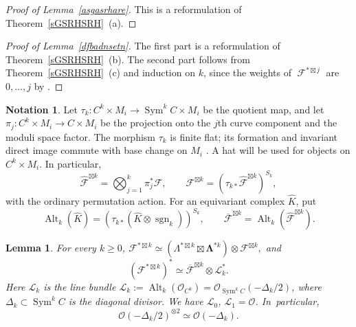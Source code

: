 \documentclass[11pt,letterpaper]{amsart}
\theoremstyle{plain}
\newtheorem{lemma}[theorem]{Lemma}
\theoremstyle{definition}
\newtheorem{notation}[theorem]{Notation}
\theoremstyle{remark}
\numberwithin{equation}{section}
\DeclareMathOperator{\Sym}{Sym}
\DeclareMathOperator{\cF}{\mathcal{F}}
\begin{document}
\begin{proof}[Proof of Lemma~\ref{asgasrhare}]
This is a reformulation of Theorem~\ref{sGSRHSRH}~(a).
\end{proof}



\begin{proof}[Proof of Lemma~\ref{dfbadnsetn}]
The first part is a reformulation of Theorem~\ref{sGSRHSRH}~(b).
The second part follows from Theorem~\ref{sGSRHSRH}~(c) and induction on $k$,
since the weights of $\cF^{*\boxtimes j}$ are $0,\ldots,j$ by \cite[Theorem~3.21]{TT}.
\end{proof}



\begin{notation}\label{notation:ordered-quotient}
Let $\tau_k:C^k\times M_i\to\Sym^kC\times M_i$ be the 
quotient map, and let $\pi_j:C^k\times M_i\to C\times M_i$ be the projection
onto the $j$th curve component and the moduli space factor.  The morphism $\tau_k$ is
finite flat; its formation and invariant direct image commute with
base change on $M_i$ \cite[Lemmas~2.2 and~2.4]{TT}.
A hat will be used for objects on $C^k\times M_i$.  In particular,
\[
 \widehat{\mathcal F}^{\boxtimes k}=
 \bigotimes_{j=1}^k\pi_j^*\mathcal F,\qquad
 \mathcal F^{\boxtimes k}=
 (\tau_{k*}\widehat{\mathcal F}^{\boxtimes k})^{S_k},
\]
with the ordinary permutation action.  For an equivariant complex $\hat K$,
put
\[
 \operatorname{Alt}_k(\hat K)=
 (\tau_{k*}(\hat K\otimes\operatorname{sgn}_k))^{S_k},\qquad
 \overline{\mathcal F}^{\boxtimes k}=
 \operatorname{Alt}_k(\widehat{\mathcal F}^{\boxtimes k}).
\]
\end{notation}


\begin{lemma}\label{amazinggrace}
For every $k\ge0$,
$
 \mathcal F^{*\boxtimes k}
 \simeq
 (\Lambda^{*\boxtimes k}\boxtimes
  \boldsymbol\Lambda^{*k})\otimes
 \mathcal F^{\boxtimes k},
$
and
\[
 (\mathcal F^{*\boxtimes k})^*
 \simeq
 \overline{\mathcal F}^{\boxtimes k}
 \otimes\mathscr L_k^*.
\]
Here $\mathscr L_k$ is the line bundle
$
 \mathscr L_k:=\operatorname{Alt}_k(\mathcal O_{C^k})=
 \mathcal O_{\operatorname{Sym}^kC}(-\Delta_k/2)$,
where  
 $\Delta_k\subset\operatorname{Sym}^kC$ is the diagonal divisor. We have $\mathscr L_0$, $\mathscr L_1=\mathcal O$.
In~particular,
$$\mathcal O(-\Delta_k/2)^{\otimes2}\simeq\mathcal O(-\Delta_k).$$
\end{lemma}
\end{document}
